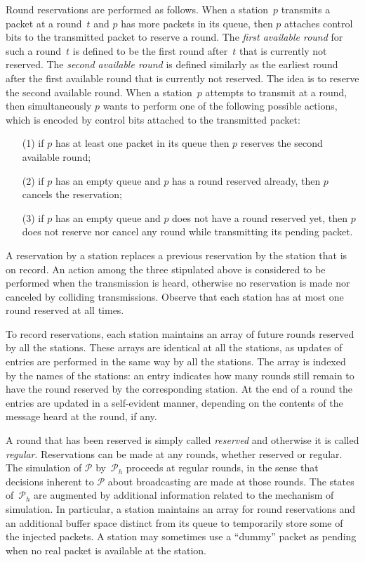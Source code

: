 \documentclass[11pt]{article}
\newcommand{\cP}{\mathcal{P}}
\begin{document}
Round reservations are performed as follows.
When a station~$p$ transmits a packet at a round~$t$ and $p$ has more packets in its queue, then $p$ attaches control bits to the transmitted packet to reserve a round.
The \emph{first available round} for such a round~$t$ is defined to be the first round after~$t$ that is currently not reserved.
The \emph{second available round} is defined similarly as the earliest round after the first available round that is currently not reserved.
The idea is to reserve the second available round.
When a station~$p$ attempts to transmit at a round, then simultaneously $p$ wants to perform one of the following possible actions, which is encoded by control bits attached to the transmitted packet:
\begin{enumerate}
\item[(1)]
if $p$ has at least one packet in its queue then $p$ reserves the second available round;

\item[(2)]
if $p$ has an empty queue and $p$ has a round reserved already, then $p$ cancels the reservation;

\item[(3)]
if $p$ has an empty queue and $p$ does not have a round reserved yet, then $p$ does not reserve nor cancel any round while transmitting its pending packet.
\end{enumerate}
A reservation by a station replaces a previous reservation by the station that is on record.
An action among the three stipulated above is considered to be performed when the transmission is heard, otherwise no reservation is made nor canceled by colliding transmissions.
Observe that each station has at most one round reserved at all times.

To record reservations, each station maintains an array of future rounds reserved by all the stations.
These arrays are identical at all the stations, as updates of entries are performed in the same way by all the stations.
The array is indexed by the names of the stations: an entry indicates how many rounds still remain to have the round reserved by the corresponding station.
At the end of a round the entries are updated in a self-evident manner, depending on the contents of the message heard at the round, if any.

A round that has been reserved  is simply called \emph{reserved} and otherwise it is called  \emph{regular}.
Reservations can be made at any rounds, whether reserved or regular.
The simulation of $\cP$ by~$\cP_{h}$ proceeds at regular rounds, in the sense that decisions inherent to $\cP$ about broadcasting are made at those rounds.
The states of~$\cP_h$ are augmented by additional information related to the mechanism of simulation.
In particular, a station maintains an array for round reservations and an additional buffer space distinct from its queue to temporarily store some of the injected packets.
A station may sometimes use a ``dummy'' packet as pending when no real packet is available at the station.
\end{document}
